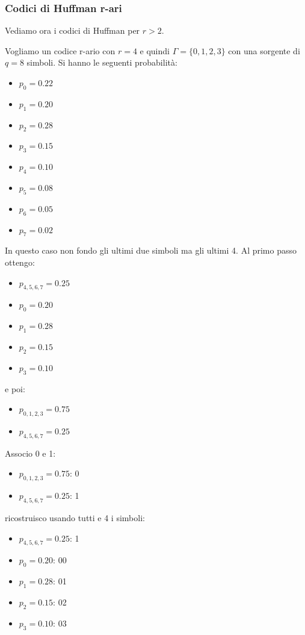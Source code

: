 \documentclass[a4paper,12pt, oneside]{book}
\begin{document}
\subsubsection{Codici di Huffman r-ari}
Vediamo ora i codici di Huffman per $r>2$.\\
\begin{esempio}
  Vogliamo un codice r-ario con $r=4$ e quindi $\Gamma=\{0,1,2,3\}$ con una
  sorgente di $q=8$ simboli. Si hanno le seguenti probabilità:
  \begin{itemize}
    \item $p_0=0.22$
    \item $p_1=0.20$
    \item $p_2=0.28$
    \item $p_3=0.15$
    \item $p_4=0.10$
    \item $p_5=0.08$
    \item $p_6=0.05$
    \item $p_7=0.02$
  \end{itemize}
  In questo caso non fondo gli ultimi due simboli ma gli ultimi 4. Al primo
  passo ottengo:
  \begin{itemize}
    \item $p_{4,5,6,7}=0.25$
    \item $p_0=0.20$
    \item $p_1=0.28$
    \item $p_2=0.15$
    \item $p_3=0.10$
  \end{itemize}
  e poi:
  \begin{itemize}
    \item $p_{0,1,2,3}=0.75$
    \item $p_{4,5,6,7}=0.25$
  \end{itemize}
  Associo 0 e 1:
    \begin{itemize}
    \item $p_{0,1,2,3}=0.75$: 0
    \item $p_{4,5,6,7}=0.25$: 1 
  \end{itemize}
  ricostruisco usando tutti e 4 i simboli:
    \begin{itemize}
    \item $p_{4,5,6,7}=0.25$: 1
    \item $p_0=0.20$: 00
    \item $p_1=0.28$: 01
    \item $p_2=0.15$: 02
    \item $p_3=0.10$: 03
  \end{itemize}

\end{esempio}
\end{document}
